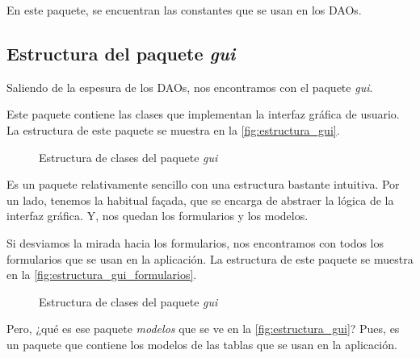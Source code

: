 En este paquete, se encuentran las constantes que se usan en los DAOs.

\subsection{Estructura del paquete \textit{gui}}\label{subsec:estructura_del_paquete_gui}
Saliendo de la espesura de los DAOs, nos encontramos con el paquete \textit{gui}.

Este paquete contiene las clases que implementan la interfaz gráfica de usuario.
La estructura de este paquete se muestra en la \autoref{fig:estructura_gui}.
\begin{figure}[h]
    \centering
    \caption{Estructura de clases del paquete \textit{gui}}
    \label{fig:estructura_gui}
\end{figure}

Es un paquete relativamente sencillo con una estructura bastante intuitiva.
Por un lado, tenemos la habitual façada, que se encarga de abstraer la lógica de la interfaz gráfica.
Y, nos quedan los formularios y los modelos.

Si desviamos la mirada hacia los formularios, nos encontramos con todos los formularios que se usan en la aplicación.
La estructura de este paquete se muestra en la \autoref{fig:estructura_gui_formularios}.

\begin{figure}[h]
    \centering
    \caption{Estructura de clases del paquete \textit{gui}}
    \label{fig:estructura_gui_formularios}
\end{figure}

Pero, ¿qué es ese paquete \textit{modelos} que se ve en la \autoref{fig:estructura_gui}?
Pues, es un paquete que contiene los modelos de las tablas que se usan en la aplicación.

